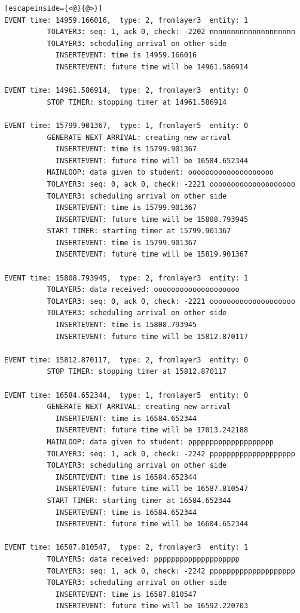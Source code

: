 \documentclass[paper=a4, fontsize=11pt]{scrartcl}
\numberwithin{equation}{section}		%
\numberwithin{figure}{section}			%
\numberwithin{table}{section}				%
\begin{document}
\begin{lstlisting}[escapeinside={<@}{@>}]
EVENT time: 14959.166016,  type: 2, fromlayer3  entity: 1
          TOLAYER3: seq: 1, ack 0, check: -2202 nnnnnnnnnnnnnnnnnnnn
          TOLAYER3: scheduling arrival on other side
            INSERTEVENT: time is 14959.166016
            INSERTEVENT: future time will be 14961.586914

EVENT time: 14961.586914,  type: 2, fromlayer3  entity: 0
          STOP TIMER: stopping timer at 14961.586914

EVENT time: 15799.901367,  type: 1, fromlayer5  entity: 0
          GENERATE NEXT ARRIVAL: creating new arrival
            INSERTEVENT: time is 15799.901367
            INSERTEVENT: future time will be 16584.652344
          MAINLOOP: data given to student: oooooooooooooooooooo
          TOLAYER3: seq: 0, ack 0, check: -2221 oooooooooooooooooooo
          TOLAYER3: scheduling arrival on other side
            INSERTEVENT: time is 15799.901367
            INSERTEVENT: future time will be 15808.793945
          START TIMER: starting timer at 15799.901367
            INSERTEVENT: time is 15799.901367
            INSERTEVENT: future time will be 15819.901367

EVENT time: 15808.793945,  type: 2, fromlayer3  entity: 1
          TOLAYER5: data received: oooooooooooooooooooo
          TOLAYER3: seq: 0, ack 0, check: -2221 oooooooooooooooooooo
          TOLAYER3: scheduling arrival on other side
            INSERTEVENT: time is 15808.793945
            INSERTEVENT: future time will be 15812.870117

EVENT time: 15812.870117,  type: 2, fromlayer3  entity: 0
          STOP TIMER: stopping timer at 15812.870117

EVENT time: 16584.652344,  type: 1, fromlayer5  entity: 0
          GENERATE NEXT ARRIVAL: creating new arrival
            INSERTEVENT: time is 16584.652344
            INSERTEVENT: future time will be 17013.242188
          MAINLOOP: data given to student: pppppppppppppppppppp
          TOLAYER3: seq: 1, ack 0, check: -2242 pppppppppppppppppppp
          TOLAYER3: scheduling arrival on other side
            INSERTEVENT: time is 16584.652344
            INSERTEVENT: future time will be 16587.810547
          START TIMER: starting timer at 16584.652344
            INSERTEVENT: time is 16584.652344
            INSERTEVENT: future time will be 16604.652344

EVENT time: 16587.810547,  type: 2, fromlayer3  entity: 1
          TOLAYER5: data received: pppppppppppppppppppp
          TOLAYER3: seq: 1, ack 0, check: -2242 pppppppppppppppppppp
          TOLAYER3: scheduling arrival on other side
            INSERTEVENT: time is 16587.810547
            INSERTEVENT: future time will be 16592.220703


\end{lstlisting}
\end{document}
